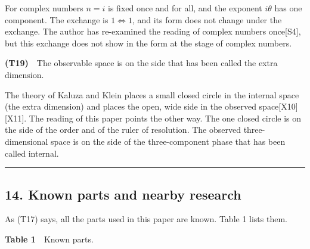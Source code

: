 \documentclass[
  a4paper,
]{article}
\begin{document}
For complex numbers \(n=i\) is fixed once and for all, and the exponent
\(i\theta\) has one component. The exchange is \(1\Leftrightarrow1\),
and its form does not change under the exchange. The author has
re-examined the reading of complex numbers once{[}S4{]}, but this
exchange does not show in the form at the stage of complex numbers.

\textbf{(T19)}　The observable space is on the side that has been called
the extra dimension.

The theory of Kaluza and Klein places a small closed circle in the
internal space (the extra dimension) and places the open, wide side in
the observed space{[}X10{]} {[}X11{]}. The reading of this paper points
the other way. The one closed circle is on the side of the order and of
the ruler of resolution. The observed three-dimensional space is on the
side of the three-component phase that has been called internal.

\begin{center}\rule{0.5\linewidth}{0.5pt}\end{center}

\subsection{14. Known parts and nearby
research}\label{known-parts-and-nearby-research}

As (T17) says, all the parts used in this paper are known. Table 1 lists
them.

\textbf{Table 1}　Known parts.
\end{document}
